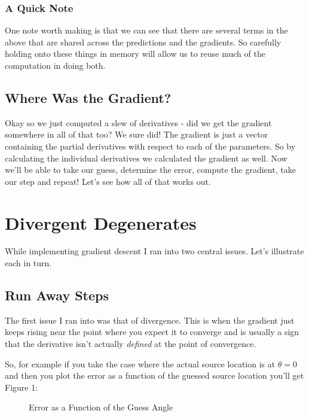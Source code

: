 \documentclass[12pt,a6paper]{book}
\begin{document}
\subsection{A Quick Note}
One note worth making is that we can see that there are several terms in the above that are shared across the predictions and the gradients. So carefully holding onto these things in memory will allow us to reuse much of the computation in doing both.

\section{Where Was the Gradient?}
Okay so we just computed a slew of derivatives - did we get the gradient somewhere in all of that too? We sure did! The gradient is just a vector containing the partial derivatives with respect to each of the parameters. So by calculating the individual derivatives we calculated the gradient as well. Now we'll be able to take our guess, determine the error, compute the gradient, take our step and repeat! Let's see how all of that works out.

\newpage



\chapter{Divergent Degenerates}
While implementing gradient descent I ran into two central issues. Let's illustrate each in turn.

\section{Run Away Steps}
The first issue I ran into was that of divergence. This is when the gradient just keeps rising near the point where you expect it to converge and is usually a sign that the derivative isn't actually \textit{defined} at the point of convergence. 

So, for example if you take the case where the actual source location is at $\theta=0$ and then you plot the error as a function of the guessed source location you'll get Figure 1:

\begin{figure}[!htb]
\caption{\label{fig:my-label} Error as a Function of the Guess Angle}
\end{figure}
\end{document}
